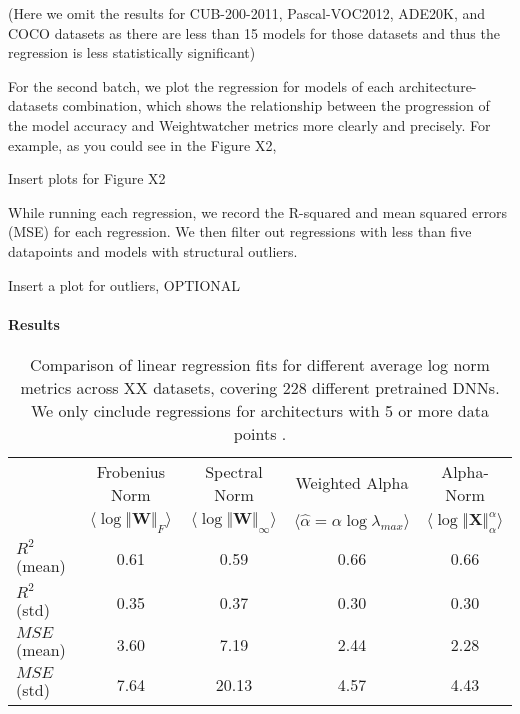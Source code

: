 
(Here we omit the results for CUB-200-2011, Pascal-VOC2012, ADE20K, and COCO datasets as there are less than 15 models for those datasets and thus the regression is less statistically significant)


For the second batch, we plot the regression for models of each architecture-datasets combination, which shows the relationship between the progression of the model accuracy and Weightwatcher metrics more clearly and precisely. For example, as you could see in the Figure X2, 


Insert plots for Figure X2

While running each regression, we record the R-squared and mean squared errors (MSE) for each regression. We then filter out regressions with less than five datapoints and models with structural outliers.


Insert a plot for outliers, OPTIONAL


\paragraph{Results}
\begin{table}[t]
\small
\begin{center}
\begin{tabular}{|p{1in}|c|c|c|c|}
\hline
    & Frobenius Norm & Spectral Norm & Weighted Alpha & Alpha-Norm \\
    & $\langle\log\Vert\mathbf{W}\Vert_{F}\rangle$ & $\langle\log\Vert\mathbf{W}\Vert_{\infty}\rangle$ & $\langle\hat{\alpha}=\alpha\log\lambda_{max}\rangle$ & $\langle\log\Vert\mathbf{X}\Vert^{\alpha}_{\alpha}\rangle$ \\
\hline
$R^{2}$ (mean)  & 0.61 & 0.59 & 0.66 & 0.66 \\
$R^{2}$ (std)   & 0.35 & 0.37 & 0.30 & 0.30 \\
\hline
$MSE$ (mean)    & 3.60 &  7.19 & 2.44 & 2.28 \\
$MSE$ (std)     & 7.64 & 20.13 & 4.57 & 4.43 \\
\hline
\end{tabular}
\end{center}
\caption{Comparison of linear regression fits for different average log norm metrics across XX datasets, covering 228 different pretrained DNNs.  We only cinclude regressions for architecturs with 5 or more data points .}
\label{table:nlp}
\end{table}


